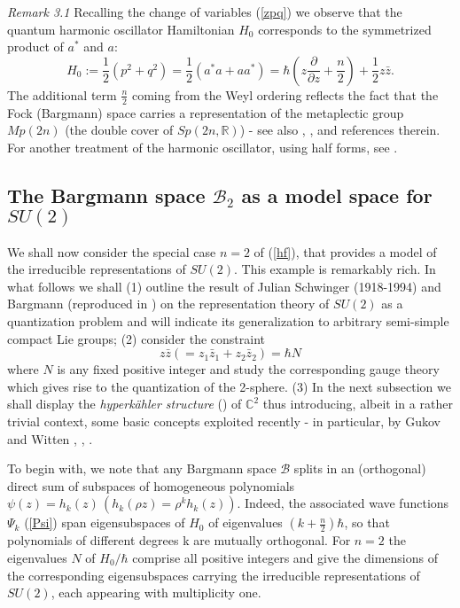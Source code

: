 \documentclass[12pt]{article}
\begin{document}
{\it Remark 3.1} Recalling the change of variables (\ref{zpq}) we observe that the quantum harmonic oscillator Hamiltonian $H_0$ corresponds to the symmetrized product
of $a^*$ and $a$:
\begin{equation}
\label{osc}
H_0 := \frac{1}{2}(p^2 + q^2) = \frac{1}{2}(a^* a + a a^*) = 
\hbar (z\frac{\partial}{\partial z} + \frac{n}{2}) + \frac{1}{2}z\bar z.
\end{equation}
The additional term $\frac{n}{2}$ coming from the Weyl ordering reflects the fact that the Fock (Bargmann) space carries a representation of the metaplectic group
$Mp(2n)$ (the double cover of $Sp(2n, {\mathbb R})$) \cite{W64} - see also \cite{F}, \cite{deG}, \cite{T10} and references therein. For another treatment of the harmonic 
oscillator, using half forms, see \cite{B}.

\smallskip

\subsection{The Bargmann space ${\mathcal B}_2$ as a model space for $SU(2)$}
 
\smallskip
                                 
We shall now consider the special case $n=2$ of (\ref{hf}), that provides a model of the irreducible representations of $SU(2)$.  This example is remarkably rich. In what follows we shall (1) outline the result of Julian Schwinger (1918-1994) \cite{Sc} and Bargmann \cite{B62} (reproduced in \cite{QTAM}) on the representation theory of $SU(2)$ as a quantization problem and will indicate its generalization to arbitrary semi-simple compact Lie groups; (2) consider the constraint
\begin{equation}
\label{zp}
z\bar{z} (= z_1\bar{z}_1 + z_2\bar{z}_2) = \hbar N   
\end{equation}
where $N$ is any fixed positive integer and study the corresponding gauge theory which gives rise to the quantization of the 2-sphere.
(3) In the next subsection we shall display the {\it hyperk\"ahler structure} (\cite{Hi}) of
 ${\mathbb C}^2$ thus introducing, albeit in a rather trivial context, some basic concepts 
exploited recently - in particular, by Gukov and Witten \cite{GW}, \cite{G10}, \cite{W10}.

To begin with, we note that any Bargmann space ${\mathcal B}$ splits in an (orthogonal) direct sum of
subspaces of homogeneous polynomials $\psi(z) = h_k(z) \, (h_k(\rho z) = \rho^k h_k(z))$. Indeed, the
associated wave functions $\Psi_k$ (\ref{Psi}) span eigensubspaces of $H_0$ of eigenvalues $(k + 
\frac{n}{2})\hbar$, so that polynomials of different degrees k are mutually orthogonal. For $n=2$ the 
eigenvalues $N$ of $H_0/\hbar$ comprise all positive integers and give the dimensions of the corresponding 
eigensubspaces carrying the irreducible representations of $SU(2)$, each appearing with multiplicity one. 
\end{document}
